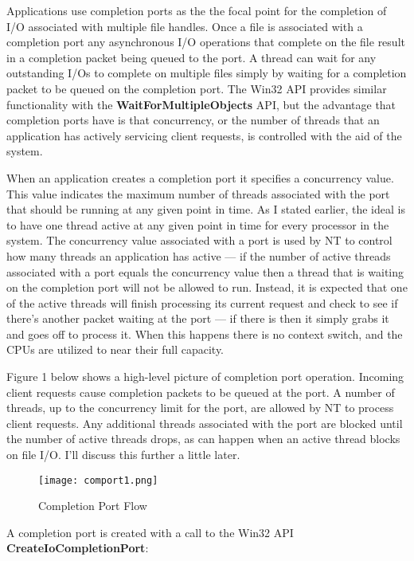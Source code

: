 \documentclass[a4paper,12pt,notitlepage,twoside,openright]{article}
\begin{document}
Applications use completion ports as the the focal point for the completion of I/O associated with multiple file handles. Once a file is associated with a completion port any asynchronous I/O operations that complete on the file result in a completion packet being queued to the port. A thread can wait for any outstanding I/Os to complete on multiple files simply by waiting for a completion packet to be queued on the completion port. The Win32 API provides similar functionality with the \textbf{WaitForMultipleObjects} API, but the advantage that completion ports have is that concurrency, or the number of threads that an application has actively servicing client requests, is controlled with the aid of the system.

When an application creates a completion port it specifies a concurrency value. This value indicates the maximum number of threads associated with the port that should be running at any given point in time. As I stated earlier, the ideal is to have one thread active at any given point in time for every processor in the system. The concurrency value associated with a port is used by NT to control how many threads an application has active --- if the number of active threads associated with a port equals the concurrency value then a thread that is waiting on the completion port will not be allowed to run. Instead, it is expected that one of the active threads will finish processing its current request and check to see if there's another packet waiting at the port --- if there is then it simply grabs it and goes off to process it. When this happens there is no context switch, and the CPUs are utilized to near their full capacity.

Figure 1 below shows a high-level picture of completion port operation. Incoming client requests cause completion packets to be queued at the port. A number of threads, up to the concurrency limit for the port, are allowed by NT to process client requests. Any additional threads associated with the port are blocked until the number of active threads drops, as can happen when an active thread blocks on file I/O. I'll discuss this further a little later.

\begin{figure}
  \centering
  \texttt{[image: comport1.png]}
  \caption{Completion Port Flow\label{fig1}}
\end{figure}

A completion port is created with a call to the Win32 API \textbf{CreateIoCompletionPort}:
\end{document}

